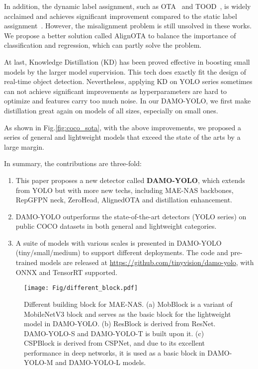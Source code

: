 \documentclass[10pt,twocolumn,letterpaper]{article}
\begin{document}
In addition, the dynamic label assignment, such as OTA~\cite{ge2021ota} and TOOD~\cite{tood}, is widely acclaimed and achieves significant improvement compared to the static label assignment~\cite{zhu2020autoassign}. However, the misalignment problem is still unsolved in these works. We propose a better solution called AlignOTA to balance the importance of classification and regression, which can partly solve the problem.

At last, Knowledge Distillation (KD) has been proved effective in boosting small models by the larger model supervision. This tech does exactly fit the design of real-time object detection. Nevertheless, applying KD on YOLO series sometimes can not achieve significant improvements as hyperparameters are hard to optimize and features carry too much noise. In our DAMO-YOLO, we first make distillation great again on models of all sizes, especially on small ones.



As shown in Fig.\ref{fig:coco_sota}, with the above improvements, we proposed a series of general and lightweight models that exceed the state of the arts by a large margin.

In summary, the contributions are three-fold:
\begin{enumerate} 
\item This paper proposes a new detector called \textbf{DAMO-YOLO}, which extends from YOLO but with more new techs, including MAE-NAS backbones, RepGFPN neck, ZeroHead, AlignedOTA and distillation enhancement.
\item DAMO-YOLO outperforms the state-of-the-art detectors (\eg YOLO series) on public COCO datasets in both general and lightweight categories.
\item A suite of models with various scales is presented in DAMO-YOLO (tiny/small/medium) to support different deployments. The code and pre-trained models are released at \href{https://github.com/tinyvision/damo-yolo}{https://github.com/tinyvision/damo-yolo}, with ONNX and TensorRT supported.
\end{enumerate} 

\begin{figure*}
    \begin{center}
    \texttt{[image: Fig/different\_block.pdf]} 
    \end{center}
       \caption{Different building block for MAE-NAS. (a) MobBlock is a variant of MobileNetV3 block and serves as the basic block for the lightweight model in DAMO-YOLO. (b) ResBlock is derived from ResNet. DAMO-YOLO-S and DAMO-YOLO-T is built upon it. (c) CSPBlock is derived from CSPNet, and due to its excellent performance in deep networks, it is used as a basic block in DAMO-YOLO-M and DAMO-YOLO-L models.}
    \label{fig:blocks}
\end{figure*}
\end{document}
